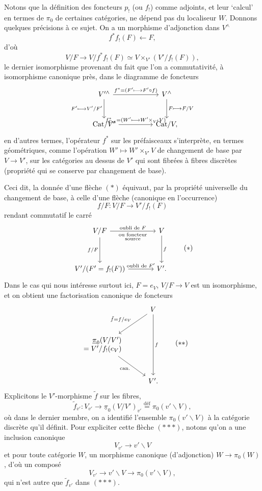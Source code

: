 \documentclass[11pt]{article}
\newcommand{\printedpage}[1]{\marginpar{\footnotesize p.~#1}}
\newcommand{\msp}[1]{\marginpar{\footnotesize [#1]}}
\newcommand{\Cat}{\mathrm{Cat}}
\newcommand{\defeq}{\overset{\text{déf}}{=}}
\newcommand{\upi}{\underline{\pi}}
\begin{document}
Notons que la définition des foncteurs $p_!$ (ou $f_!$) comme adjoints, et leur `calcul' en termes de $\pi_0$ de certaines catégories, ne dépend pas du localiseur $W$. Donnons quelques précisions à ce sujet. On a un morphisme d'adjonction dans $V^{\wedge}$
\[ f^*f_!(F) \longleftarrow F, \]
d'où
\[ V/F \longrightarrow V/f^*f_!(F) \simeq V \times_{V'} (V'/f_!(F)), \tag*{$(*)$} \]
le dernier isomorphisme provenant du fait que l'on a commutativité, à isomorphisme canonique près, dans le diagramme de foncteurs
\[
\begin{tikzcd}[column sep=huge, row sep=large]
V'^{\wedge} \arrow[r, "f^*=(F'\longmapsto F'\circ f)"] \arrow[d, "F'\longmapsto V'/F'"'] & V^{\wedge} \arrow[d, "F\longmapsto F/V"] \\
\Cat/V' \arrow[r, "f^*_{\Cat}=(W'\longmapsto W'\times_{V'}V)"] & \Cat/V,
\end{tikzcd}
\]
\printedpage{64}
\msp{page 90}
en d'autres termes, l'opérateur $f^*$ sur les préfaisceaux s'interprète, en termes géométriques, comme l'opération $W' \longmapsto W' \times_{V'} V$ de changement de base par $V \longrightarrow V'$, sur les catégories au dessus de $V'$ qui sont fibrées à fibres discrètes (propriété qui se conserve par changement de base).

Ceci dit, la donnée d'une flèche $(*)$ équivaut, par la propriété universelle du changement de base, à celle d'une flèche (canonique en l'occurrence)
\[ f/F : V/F \longrightarrow V'/f_!(F) \]
rendant commutatif le carré
\[
\begin{tikzcd}[column sep=large, row sep=huge]
V/F \arrow[r, "\text{oubli de }F", "\substack{\text{ou foncteur}\\ \text{source}}"'] \arrow[d, "f/F"'] & V \arrow[d, "f"] \\
V'/(F' = f_!(F)) \arrow[r, "\text{oubli de }F'"] & V'.
\end{tikzcd}
\tag*{$(*)$}
\]
Dans le cas qui nous intéresse surtout ici, $F = e_V$, $V/F \longrightarrow V$ est un isomorphisme, et on obtient une factorisation canonique de foncteurs \msp{page 91}
\[
\begin{tikzcd}[row sep=large]
 & V \arrow[dl, "\tilde{f}=f/e_V"'] \arrow[dd, "f"] \\
\begin{array}{r} \upi_0(V/V') \\ = V'/f_!(e_V) \end{array} \arrow[dr, "\text{can.}"'] & \\
 & V'.
\end{tikzcd}
\tag*{$(**)$}
\]
Explicitons le $V'$-morphisme $\tilde{f}$ sur les fibres,
\[ \tilde{f}_{v'} : V_{v'} \longrightarrow \upi_0(V/V')_{v'} \defeq \pi_0(v'\backslash V), \tag*{$(***)$} \]
où dans le dernier membre, on a identifié l'ensemble $\pi_0(v'\backslash V)$ à la catégorie discrète qu'il définit. Pour expliciter cette flèche $(***)$, notons qu'on a une inclusion canonique
\[ V_{v'} \longrightarrow v'\backslash V \]
et pour toute catégorie $W$, un morphisme canonique (d'adjonction) $W \longrightarrow \pi_0(W)$, d'où un composé
\[ V_{v'} \longrightarrow v'\backslash V \longrightarrow \pi_0(v'\backslash V), \]
qui n'est autre que $\tilde{f}_{v'}$ dans $(***)$.
\end{document}
